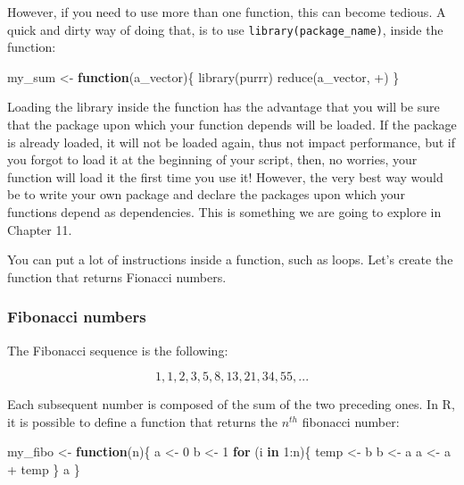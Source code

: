 \documentclass[
]{article}
\newenvironment{Shaded}{\begin{snugshade}}{\end{snugshade}}
\newcommand{\AttributeTok}[1]{\textcolor[rgb]{0.77,0.63,0.00}{#1}}
\newcommand{\ControlFlowTok}[1]{\textcolor[rgb]{0.13,0.29,0.53}{\textbf{#1}}}
\newcommand{\DecValTok}[1]{\textcolor[rgb]{0.00,0.00,0.81}{#1}}
\newcommand{\FunctionTok}[1]{\textcolor[rgb]{0.00,0.00,0.00}{#1}}
\newcommand{\NormalTok}[1]{#1}
\newcommand{\OtherTok}[1]{\textcolor[rgb]{0.56,0.35,0.01}{#1}}
\newcommand{\SpecialCharTok}[1]{\textcolor[rgb]{0.00,0.00,0.00}{#1}}
\newcommand{\StringTok}[1]{\textcolor[rgb]{0.31,0.60,0.02}{#1}}
\begin{document}
However, if you need to use more than one function, this can become tedious. A quick and dirty
way of doing that, is to use \texttt{library(package\_name)}, inside the function:

\begin{Shaded}
\begin{Highlighting}[]
\NormalTok{my\_sum }\OtherTok{\textless{}{-}} \ControlFlowTok{function}\NormalTok{(a\_vector)\{}
  \FunctionTok{library}\NormalTok{(purrr)}
  \FunctionTok{reduce}\NormalTok{(a\_vector, }\StringTok{\textasciigrave{}}\AttributeTok{+}\StringTok{\textasciigrave{}}\NormalTok{)}
\NormalTok{\}}
\end{Highlighting}
\end{Shaded}

Loading the library inside the function has the advantage that you will be sure that the package
upon which your function depends will be loaded. If the package is already loaded, it will not be
loaded again, thus not impact performance, but if you forgot to load it at the beginning of your
script, then, no worries, your function will load it the first time you use it! However, the very
best way would be to write your own package and declare the packages upon which your functions
depend as dependencies. This is something we are going to explore in Chapter 11.

You can put a lot of instructions inside a function, such as loops. Let's create the function that
returns Fionacci numbers.

\hypertarget{fibonacci-numbers}{%
\subsubsection{Fibonacci numbers}\label{fibonacci-numbers}}

The Fibonacci sequence is the following:

\[1, 1, 2, 3, 5, 8, 13, 21, 34, 55, ...\]

Each subsequent number is composed of the sum of the two preceding ones. In R, it is possible to define a function that returns the \(n^{th}\) fibonacci number:

\begin{Shaded}
\begin{Highlighting}[]
\NormalTok{my\_fibo }\OtherTok{\textless{}{-}} \ControlFlowTok{function}\NormalTok{(n)\{}
\NormalTok{ a }\OtherTok{\textless{}{-}} \DecValTok{0}
\NormalTok{ b }\OtherTok{\textless{}{-}} \DecValTok{1}
 \ControlFlowTok{for}\NormalTok{ (i }\ControlFlowTok{in} \DecValTok{1}\SpecialCharTok{:}\NormalTok{n)\{}
\NormalTok{  temp }\OtherTok{\textless{}{-}}\NormalTok{ b}
\NormalTok{  b }\OtherTok{\textless{}{-}}\NormalTok{ a}
\NormalTok{  a }\OtherTok{\textless{}{-}}\NormalTok{ a }\SpecialCharTok{+}\NormalTok{ temp}
\NormalTok{ \}}
\NormalTok{ a}
\NormalTok{\}}
\end{Highlighting}
\end{Shaded}
\end{document}
